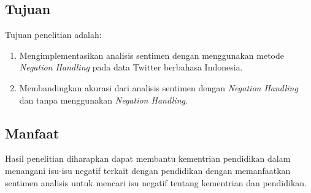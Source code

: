 \subsection*{Tujuan}
Tujuan penelitian adalah:
\begin{enumerate}[noitemsep] 
	\item Mengimplementasikan analisis sentimen dengan menggunakan metode \textit{Negation Handling} pada data Twitter berbahasa Indonesia.
	\item Membandingkan akurasi dari analisis sentimen dengan \textit{Negation Handling} dan tanpa menggunakan \textit{Negation Handling}.
\end{enumerate}

\subsection*{Manfaat}

Hasil penelitian diharapkan dapat membantu kementrian pendidikan dalam menangani isu-isu negatif terkait dengan pendidikan dengan memanfaatkan sentimen analisis untuk mencari isu negatif tentang kementrian dan pendidikan.

